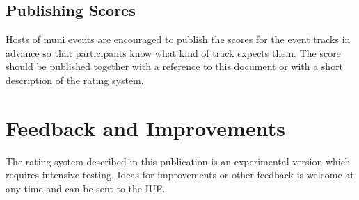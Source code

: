 \documentclass[a4paper,oneside]{scrartcl}
\begin{document}
\subsection{Publishing Scores}
Hosts of muni events are encouraged to publish the scores for the event tracks
in advance so that participants know what kind of track expects them.
The score should be published together with a reference to this document or with a
short description of the rating system.

\section{Feedback and Improvements}
The rating system described in this publication is an experimental version which
requires intensive testing. Ideas for improvements or other feedback is welcome
at any time and can be sent to the IUF.
\end{document}
